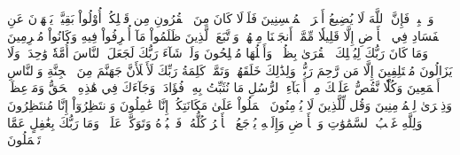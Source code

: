 وَٱصۡبِرۡ فَإِنَّ ٱللَّهَ لَا يُضِيعُ أَجۡرَ ٱلۡمُحۡسِنِينَ
فَلَوۡلَا كَانَ مِنَ ٱلۡقُرُونِ مِن قَبۡلِكُمۡ أُوْلُواْ بَقِيَّةٖ يَنۡهَوۡنَ عَنِ ٱلۡفَسَادِ فِي ٱلۡأَرۡضِ إِلَّا قَلِيلٗا مِّمَّنۡ أَنجَيۡنَا مِنۡهُمۡۗ وَٱتَّبَعَ ٱلَّذِينَ ظَلَمُواْ مَآ أُتۡرِفُواْ فِيهِ وَكَانُواْ مُجۡرِمِينَ
وَمَا كَانَ رَبُّكَ لِيُهۡلِكَ ٱلۡقُرَىٰ بِظُلۡمٖ وَأَهۡلُهَا مُصۡلِحُونَ
وَلَوۡ شَآءَ رَبُّكَ لَجَعَلَ ٱلنَّاسَ أُمَّةٗ وَٰحِدَةٗۖ وَلَا يَزَالُونَ مُخۡتَلِفِينَ
إِلَّا مَن رَّحِمَ رَبُّكَۚ وَلِذَٰلِكَ خَلَقَهُمۡۗ وَتَمَّتۡ كَلِمَةُ رَبِّكَ لَأَمۡلَأَنَّ جَهَنَّمَ مِنَ ٱلۡجِنَّةِ وَٱلنَّاسِ أَجۡمَعِينَ
وَكُلّٗا نَّقُصُّ عَلَيۡكَ مِنۡ أَنۢبَآءِ ٱلرُّسُلِ مَا نُثَبِّتُ بِهِۦ فُؤَادَكَۚ وَجَآءَكَ فِي هَٰذِهِ ٱلۡحَقُّ وَمَوۡعِظَةٞ وَذِكۡرَىٰ لِلۡمُؤۡمِنِينَ
وَقُل لِّلَّذِينَ لَا يُؤۡمِنُونَ ٱعۡمَلُواْ عَلَىٰ مَكَانَتِكُمۡ إِنَّا عَٰمِلُونَ
وَٱنتَظِرُوٓاْ إِنَّا مُنتَظِرُونَ
وَلِلَّهِ غَيۡبُ ٱلسَّمَٰوَٰتِ وَٱلۡأَرۡضِ وَإِلَيۡهِ يُرۡجَعُ ٱلۡأَمۡرُ كُلُّهُۥ فَٱعۡبُدۡهُ وَتَوَكَّلۡ عَلَيۡهِۚ وَمَا رَبُّكَ بِغَٰفِلٍ عَمَّا تَعۡمَلُونَ